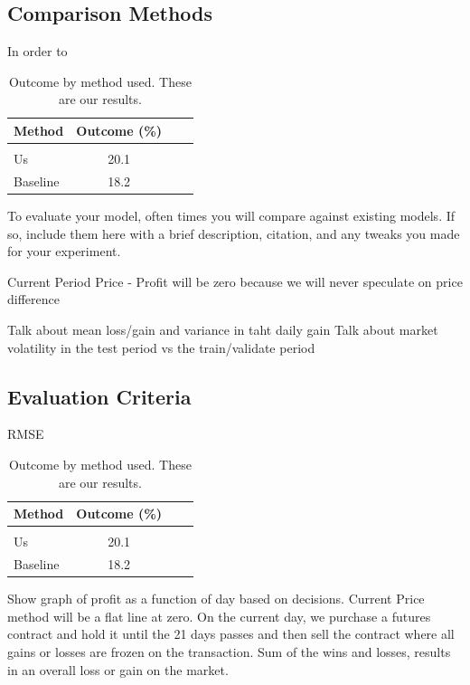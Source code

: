 \documentclass[twoside,11pt]{article}
\begin{document}
\subsection{Comparison Methods}

In order to 

\begin{table}[htbp]
	\centering
	\begin{tabular}{lclc}
		Method & Outcome (\%) \\
		\hline \\[-11pt]
		Us & 20.1 \\
		Baseline & 18.2 \\ \hline
	\end{tabular}
	\label{tab:example}
	\caption{Outcome by method used. These are our results.}
\end{table}

To evaluate your model, often times you will compare against existing models.
If so, include them here with a brief description, citation, and any tweaks you made for your experiment.

Current Period Price - Profit will be zero because we will never speculate on price
difference

  Talk about mean loss/gain and variance in taht daily gain
  Talk about market volatility in the test period vs the train/validate period

\subsection{Evaluation Criteria}

RMSE


\begin{table}[htbp]
	\centering
	\begin{tabular}{lclc}
		Method & Outcome (\%) \\
		\hline \\[-11pt]
		Us & 20.1 \\
		Baseline & 18.2 \\ \hline
	\end{tabular}
	\label{tab:example}
	\caption{Outcome by method used. These are our results.}
\end{table}
  Show graph of profit as a function of day based on decisions. Current Price method will be a flat line at zero.
  On the current day, we purchase a futures contract and hold it until the 21 days passes and then sell the contract where all gains or losses are frozen on the transaction.
  Sum of the wins and losses, results in an overall loss or gain on the market.
\end{document}
